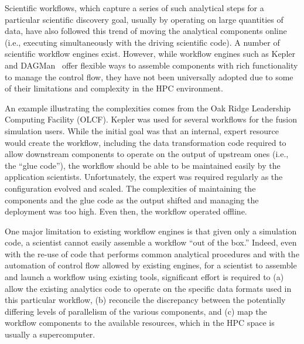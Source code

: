 
Scientific workflows, which 
capture a series of such analytical steps for a
particular scientific discovery goal, usually
by operating on large quantities of data,
have also followed this trend of moving the analytical components
online (i.e., executing simultaneously with the driving scientific code).
A number of scientific workflow engines exist.
However, while workflow engines such as
Kepler~\cite{bertram:2006:kepler} and
DAGMan~\cite{Malewicz:2006:dagman}
offer flexible ways to assemble components
with rich functionality to manage the control flow, they have not been
universally adopted due to some of their limitations and complexity in the
HPC environment.

An example illustrating the complexities comes from the Oak Ridge
Leadership Computing Facility (OLCF).  Kepler was used for several workflows
for the fusion simulation users.  While the initial goal was that an internal,
expert resource would create the workflow,
including the data transformation code required
to allow downstream components to operate on the output of
upstream ones (i.e., the ``glue code''),
the workflow should be able to be maintained
easily by the application scientists. Unfortunately,
the expert was required regularly as the configuration evolved and scaled.
The complexities of maintaining the components and the glue code as the output
shifted and managing the deployment was too high.
Even then, the workflow operated offline.

One major limitation to existing workflow engines is that
given only a simulation code, a scientist cannot easily
assemble a workflow ``out of the box.''
Indeed, even with the re-use of code that performs
common analytical procedures and with the automation of control flow
allowed by existing engines,
for a scientist to assemble
and launch a workflow using existing tools,
significant effort is required to (a) allow the existing
analytics code
to operate on the specific data formats used in this
particular workflow,
(b) reconcile the discrepancy between the potentially
differing levels of parallelism
of the various components,
and (c) map the workflow components
to the available resources, which in the HPC space
is usually a supercomputer.



